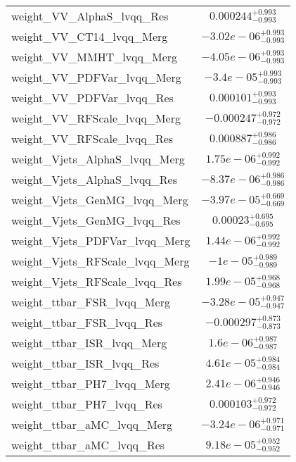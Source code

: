 \begin{tabular}{|l|c|}
weight\_VV\_AlphaS\_lvqq\_Res & $0.000244^{+0.993}_{-0.993}$ \\
weight\_VV\_CT14\_lvqq\_Merg & $-3.02e-06^{+0.993}_{-0.993}$ \\
weight\_VV\_MMHT\_lvqq\_Merg & $-4.05e-06^{+0.993}_{-0.993}$ \\
weight\_VV\_PDFVar\_lvqq\_Merg & $-3.4e-05^{+0.993}_{-0.993}$ \\
weight\_VV\_PDFVar\_lvqq\_Res & $0.000101^{+0.993}_{-0.993}$ \\
weight\_VV\_RFScale\_lvqq\_Merg & $-0.000247^{+0.972}_{-0.972}$ \\
weight\_VV\_RFScale\_lvqq\_Res & $0.000887^{+0.986}_{-0.986}$ \\
weight\_Vjets\_AlphaS\_lvqq\_Merg & $1.75e-06^{+0.992}_{-0.992}$ \\
weight\_Vjets\_AlphaS\_lvqq\_Res & $-8.37e-06^{+0.986}_{-0.986}$ \\
weight\_Vjets\_GenMG\_lvqq\_Merg & $-3.97e-05^{+0.669}_{-0.669}$ \\
weight\_Vjets\_GenMG\_lvqq\_Res & $0.00023^{+0.695}_{-0.695}$ \\
weight\_Vjets\_PDFVar\_lvqq\_Merg & $1.44e-06^{+0.992}_{-0.992}$ \\
weight\_Vjets\_RFScale\_lvqq\_Merg & $-1e-05^{+0.989}_{-0.989}$ \\
weight\_Vjets\_RFScale\_lvqq\_Res & $1.99e-05^{+0.968}_{-0.968}$ \\
weight\_ttbar\_FSR\_lvqq\_Merg & $-3.28e-05^{+0.947}_{-0.947}$ \\
weight\_ttbar\_FSR\_lvqq\_Res & $-0.000297^{+0.873}_{-0.873}$ \\
weight\_ttbar\_ISR\_lvqq\_Merg & $1.6e-06^{+0.987}_{-0.987}$ \\
weight\_ttbar\_ISR\_lvqq\_Res & $4.61e-05^{+0.984}_{-0.984}$ \\
weight\_ttbar\_PH7\_lvqq\_Merg & $2.41e-06^{+0.946}_{-0.946}$ \\
weight\_ttbar\_PH7\_lvqq\_Res & $0.000103^{+0.972}_{-0.972}$ \\
weight\_ttbar\_aMC\_lvqq\_Merg & $-3.24e-06^{+0.971}_{-0.971}$ \\
weight\_ttbar\_aMC\_lvqq\_Res & $9.18e-05^{+0.952}_{-0.952}$ \\
\hline
\end{tabular}
